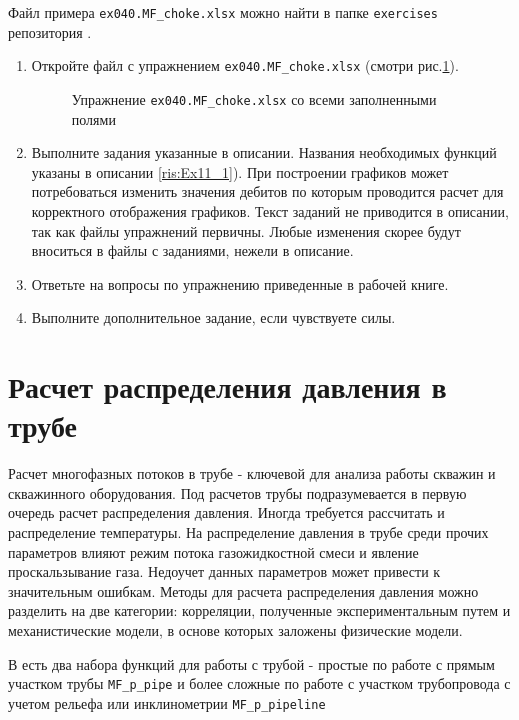 Файл примера \texttt{ex040.MF_choke.xlsx} можно найти в папке \texttt{exercises} репозитория \unf{}.

\begin{enumerate}
	
	\item Откройте файл с упражнением \texttt{ex040.MF_choke.xlsx} (смотри рис.\ref{ris:Ex40_1}).
	
	\begin{figure}[h!]
		\center{\texttt{[image: Ex40\_1]}}
		\caption{Упражнение \texttt{ex040.MF_choke.xlsx} со всеми заполненными полями }
		\label{ris:Ex40_1}
	\end{figure}
	
	\item Выполните задания указанные в описании. Названия необходимых функций указаны в описании  \ref{ris:Ex11_1}). При построении графиков может потребоваться изменить значения дебитов по которым проводится расчет для корректного отображения графиков. Текст заданий не приводится в описании, так как файлы упражнений первичны. Любые изменения скорее будут вноситься в файлы с заданиями, нежели в описание. 
	
	\item Ответьте на вопросы по упражнению приведенные в рабочей книге.
	
	\item Выполните дополнительное задание, если чувствуете силы.
	
\end{enumerate}


\section{Расчет распределения давления в трубе}
Расчет многофазных потоков в трубе - ключевой для анализа работы скважин и скважинного оборудования. Под расчетов трубы подразумевается в первую очередь расчет распределения давления. Иногда требуется рассчитать и распределение температуры. 
На распределение давления в трубе среди прочих параметров влияют режим потока газожидкостной смеси и явление проскальзывание газа. Недоучет данных параметров может привести к значительным ошибкам. Методы для расчета распределения давления можно разделить на две категории: корреляции, полученные экспериментальным путем и механистические модели, в основе которых заложены физические модели.

В \unf{} есть два набора функций для работы с трубой - простые по работе с прямым участком трубы \texttt{MF_p_pipe} и более сложные по работе с участком трубопровода с учетом рельефа или инклинометрии \texttt{MF_p_pipeline}

